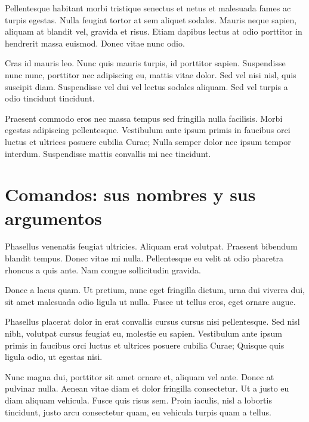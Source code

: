 \documentclass[12pt,a4paper]{report}
\begin{document}
Pellentesque habitant morbi tristique senectus et netus et malesuada fames ac turpis egestas. Nulla feugiat tortor at sem aliquet sodales. Mauris neque sapien, aliquam at blandit vel, gravida et risus. Etiam dapibus lectus at odio porttitor in hendrerit massa euismod. Donec vitae nunc odio. 

Cras id mauris leo. Nunc quis mauris turpis, id porttitor sapien. Suspendisse nunc nunc, porttitor nec adipiscing eu, mattis vitae dolor. Sed vel nisi nisl, quis suscipit diam. Suspendisse vel dui vel lectus sodales aliquam. Sed vel turpis a odio tincidunt tincidunt.

Praesent commodo eros nec massa tempus sed fringilla nulla facilisis. Morbi egestas adipiscing pellentesque. Vestibulum ante ipsum primis in faucibus orci luctus et ultrices posuere cubilia Curae; Nulla semper dolor nec ipsum tempor interdum. Suspendisse mattis convallis mi nec tincidunt. 





\section{Comandos: sus nombres y sus argumentos}
\label{seccion.comandos}



Phasellus venenatis feugiat ultricies. Aliquam erat volutpat. Praesent bibendum blandit tempus. Donec vitae mi nulla. Pellentesque eu velit at odio pharetra rhoncus a quis ante. Nam congue sollicitudin gravida. 

Donec a lacus quam. Ut pretium, nunc eget fringilla dictum, urna dui viverra dui, sit amet malesuada odio ligula ut nulla. Fusce ut tellus eros, eget ornare augue.

Phasellus placerat dolor in erat convallis cursus cursus nisi pellentesque. Sed nisl nibh, volutpat cursus feugiat eu, molestie eu sapien. Vestibulum ante ipsum primis in faucibus orci luctus et ultrices posuere cubilia Curae; Quisque quis ligula odio, ut egestas nisi. 

Nunc magna dui, porttitor sit amet ornare et, aliquam vel ante. Donec at pulvinar nulla. Aenean vitae diam et dolor fringilla consectetur. Ut a justo eu diam aliquam vehicula. Fusce quis risus sem. Proin iaculis, nisl a lobortis tincidunt, justo arcu consectetur quam, eu vehicula turpis quam a tellus.
\end{document}
